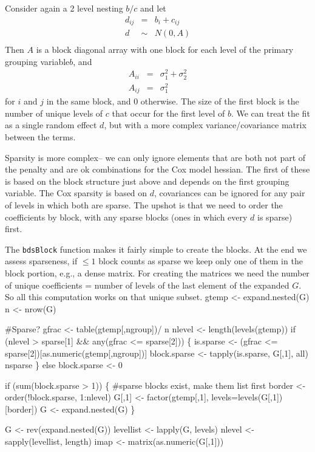 \documentclass{article}
\begin{document}
Consider again a 2 level nesting $b/c$ and let
\begin{eqnarray*}
 d_{ij}&=& b_i + c_{ij} \\
 d &\sim& N(0, A) \\
\end{eqnarray*}
Then $A$ is a block diagonal array with one block for each level
of the primary grouping variable$b$, and
\begin{eqnarray*}
  A_{ii} &=& \sigma_1^2 + \sigma_2^2\\
  A_{ij} &=& \sigma_1^2
\end{eqnarray*}
for $i$ and $j$ in the same block, and 0 otherwise.
The size of the first block is the number of unique levels of $c$ that
occur for the first level of $b$.
We can treat the fit as a single random effect $d$, but with a more
complex variance/covariance matrix between the terms.

Sparsity is more complex-- we can only ignore elements that are both
not part of the penalty and are ok combinations for the Cox model hessian.
The first of these is based on the block structure just
above and depends on the first grouping variable.  The Cox sparsity
is based on $d$, covariances can be ignored for any pair of levels in
which both are sparse.  The upshot is that we need to order the coefficients
by block, with any sparse blocks (ones in which every $d$ is sparse) first.

The {\tt{}bdsBlock} function makes it fairly simple to create the
blocks.  At the end we assess sparseness, if $\le1$ block counts as
sparse we keep only one of them in the block portion, e.g., a
dense matrix.  For creating the matrices we need the number of unique
coefficients = number of levels of the last element of the expanded $G$.
So all this computation works on that unique subset.
\nwenddocs{}\endmoddef
gtemp <- expand.nested(G)
n <- nrow(G)

#Sparse?
gfrac <- table(gtemp[,ngroup])/ n
nlevel <- length(levels(gtemp))
if (nlevel > sparse[1] && any(gfrac <= sparse[2])) \{
        is.sparse <- (gfrac <= sparse[2])[as.numeric(gtemp[,ngroup])]
        block.sparse <- tapply(is.sparse, G[,1], all)
        nsparse
        \}
else block.sparse <- 0

if (sum(block.sparse > 1)) \{ #sparse blocks exist, make them list first
    border <- order(!block.sparse, 1:nlevel)
    G[,1] <- factor(gtemp[,1], levels=levels(G[,1])[border])
    G <- expand.nested(G)
    \}

G <- rev(expand.nested(G))
levellist <- lapply(G, levels)
nlevel <-  sapply(levellist, length)
imap <- matrix(as.numeric(G[,1]))
\end{document}
